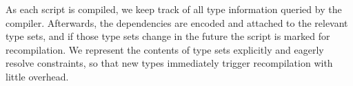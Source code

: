 As each script is compiled, we keep track of all type information queried
by the compiler.
Afterwards, the dependencies are encoded and attached
to the relevant type sets,
and if those type sets change in the future the script is
marked for recompilation.
We represent the contents of type sets explicitly and eagerly resolve
constraints, so that new types immediately
trigger recompilation with little overhead.







